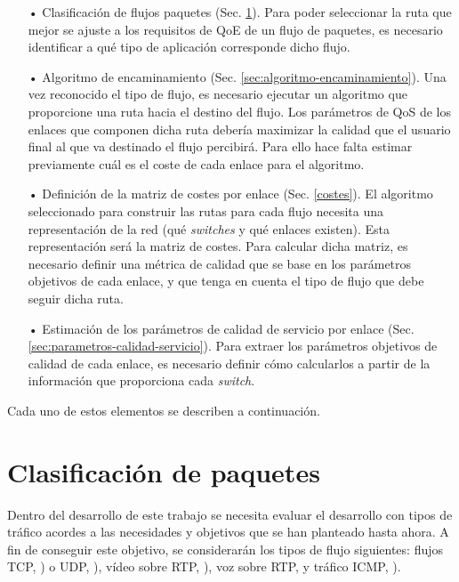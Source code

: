 \documentclass[a4paper,11pt]{book}
\begin{document}
 \begin{itemize}
  \item[•] Clasificación de flujos paquetes (Sec. \ref{sec:clasificacion-flujos}). Para poder seleccionar la ruta que mejor se ajuste a los requisitos de QoE de un flujo de paquetes, es necesario identificar a qué tipo de aplicación corresponde dicho flujo. 
  \item[•] Algoritmo de encaminamiento (Sec. \ref{sec:algoritmo-encaminamiento}). Una vez reconocido el tipo de flujo, es necesario ejecutar un algoritmo que proporcione una ruta hacia el destino del flujo. Los parámetros de \ac{QoS} de los enlaces que componen dicha ruta debería maximizar la calidad que el usuario final al que va destinado el flujo percibirá. Para ello hace falta estimar previamente cuál es el coste de cada enlace para el algoritmo.
  \item[•] Definición de la matriz de costes por enlace (Sec. \ref{costes}). El algoritmo seleccionado para construir las rutas para cada flujo necesita una representación de la red (qué \emph{switches} y qué enlaces existen). Esta representación será la matriz de costes. Para calcular dicha matriz, es necesario definir una métrica de calidad que se base en los parámetros objetivos de cada enlace, y que tenga en cuenta el tipo de flujo que debe seguir dicha ruta.
  \item[•] Estimación de los parámetros de calidad de servicio por enlace (Sec. \ref{sec:parametros-calidad-servicio}). Para extraer los parámetros objetivos de calidad de cada enlace, es necesario definir cómo calcularlos a partir de la información que proporciona cada \emph{switch}.
 \end{itemize}

 
 Cada uno de estos elementos se describen a continuación.

%
\section{Clasificación de paquetes}
\label{sec:clasificacion-flujos}

Dentro del desarrollo de este trabajo se necesita evaluar el desarrollo con tipos de tráfico acordes a las necesidades y objetivos que se han planteado hasta ahora. A fin de conseguir este objetivo, se considerarán los tipos de flujo siguientes: flujos \acf{TCP}, \cite{rfcTCP}) o \acf{UDP}, \cite{rfcUDP}), vídeo sobre \acf{RTP}, \cite{rfcRTP}), voz sobre \acf{RTP}, y tráfico \acf{ICMP}, \cite{rfcICMP}).
 
\end{document}
